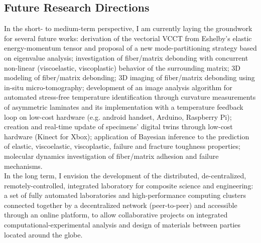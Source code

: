 \documentclass[
  a4paper, 
]{fortysecondscv}
\begin{document}
\subsection{Future Research Directions}
In the short- to medium-term perspective, I am currently laying the groundwork for several future works: derivation of the vectorial VCCT from Eshelby's elastic energy-momentum tensor and proposal of a new mode-partitioning strategy based on eigenvalue analysis; investigation of fiber/matrix debonding with concurrent non-linear (viscoelastic, viscoplastic) behavior of the surrounding matrix; 3D modeling of fiber/matrix debonding; 3D imaging of fiber/matrix debonding using in-situ micro-tomography; development of an image analysis algorithm for automated stress-free temperature identification through curvature measurements of asymmetric laminates and its implementation with a temperature feedback loop on low-cost hardware (e.g. android handset, Arduino, Raspberry Pi); creation and real-time update of specimens' digital twins through low-cost hardware (Kinect for Xbox); application of Bayesian inference to the prediction of elastic, viscoelastic, viscoplastic, failure and fracture toughness properties; molecular dynamics investigation of fiber/matrix adhesion and failure mechanisms.\\
In the long term, I envision the development of the distributed, de-centralized, remotely-controlled, integrated laboratory for composite science and engineering: a set of fully automated laboratories and high-performance computing clusters connected together by a decentralized network (peer-to-peer) and accessible through an online platform, to allow collaborative projects on integrated computational-experimental analysis and design of materials between parties located around the globe.
\end{document}
